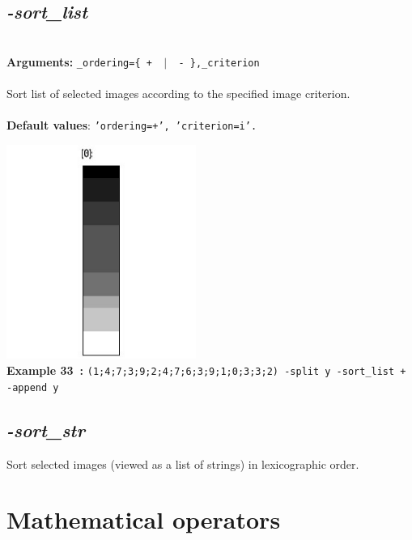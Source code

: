 \documentclass[a4paper,11pt,twoside]{book}
\begin{document}
\subsection{\emph{-sort\_list} }\vspace*{-0.5em}
~\\\textbf{Arguments: } 
{\small \texttt{\_ordering=\{ + ~$|$~ - \},\_criterion}}\\~\\
Sort list of selected images according to the specified image criterion.
~\\~\\\textbf{Default values}: {\small \texttt{'ordering=+', 'criterion=i'.}}
\begin{center}\includegraphics[keepaspectratio=true,height=7cm,width=\textwidth]{img/gmic_def33.jpg}\\
{\footnotesize \textbf{Example 33~:} \texttt{(1;4;7;3;9;2;4;7;6;3;9;1;0;3;3;2) -split y -sort\_list + -append y}}
\end{center}

\subsection{\emph{-sort\_str} }\vspace*{-0.5em}
Sort selected images (viewed as a list of strings) in lexicographic order.

\section{Mathematical operators}
\end{document}
